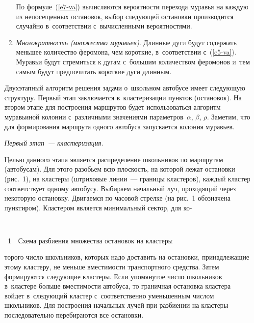 \begin{multicols}{2}
\begin{enumerate}[1.]
По формуле~(\ref{e7-va}) вычисляются вероятности перехода муравья на
каждую из непосещенных остановок, выбор следующей остановки
производится случайно в~соответствии с~вычисленными вероятностями.
\item \textit{Многократность (множество муравьев)}. Длинные дуги будут
содержать меньшее количество феромона, чем короткие, в~соответствии
с~(\ref{e5-va}). Муравьи будут стремиться к дугам с~большим количеством
феромонов и~тем самым будут предпочитать короткие дуги длинным.
\end{enumerate}

     Двухэтапный алгоритм решения задачи о~школьном автобусе имеет
следующую структуру. Первый этап заключается в~кластеризации пунктов
(остановок). На втором этапе для построения маршрутов будет использоваться
алгоритм муравьиной колонии с~различными значениями параметров~$\alpha$,
$\beta$, $\rho$. Заметим, что для формирования маршрута одного автобуса
запускается колония муравьев.

     \textit{Первый этап~--- кластеризация.}

     Целью данного этапа является распределение школьников по маршрутам
(автобусам). Для этого разобьем всю плоскость, на которой лежат остановки
(рис.~1), на кластеры (штриховые линии~--- границы кластеров), каждый
кластер соответствует одному автобусу. Выбираем начальный луч, проходящий
через некоторую остановку. Двигаемся по часовой стрелке (на рис.~1
обозначена пунктиром). Кластером является минимальный сектор, для
ко-\linebreak\vspace*{-12pt}

\begin{center}  %
\vspace*{-1pt}
 \mbox{%
 \epsfxsize=71.512mm
 }


\end{center}

\noindent
{{\figurename~1}\ \ \small{Схема разбиения множества остановок на клас\-теры}}




\vspace*{9pt}


\addtocounter{figure}{1}


\noindent
торого число школьников, которых надо доставить
 на остановки,
принадлежащие этому кластеру, не
меньше вместимости транспортного
средства. Затем формируются следующие кластеры. Если упомянутое число
школьников в~кластере больше вмес\-ти\-мости автобуса, то граничная остановка
кластера войдет в~следующий кластер с~соответственно уменьшенным чис\-лом
школьников. Для по\-стро\-ения начальных лучей при разбиении на кластеры
последовательно перебираются все остановки.




\end{multicols}
